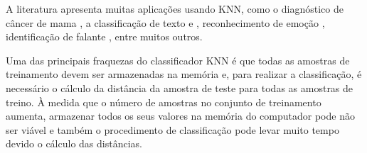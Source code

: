 A literatura apresenta muitas aplicações usando KNN, como o diagnóstico de câncer de mama \cite{Sarkar_2000}, a classificação de texto \cite{Yu_2007} e \cite{Han_2001}, reconhecimento de emoção \cite{Cheng_2008}, identificação de falante \cite{Kacur_2011} , entre muitos outros. 

Uma das principais fraquezas do classificador KNN é que todas as amostras de treinamento devem ser armazenadas na memória e, para realizar a classificação, é necessário o cálculo da distância da amostra de teste para todas as amostras de treino.  À medida que o número de amostras no conjunto de treinamento aumenta, armazenar todos os seus valores na memória do computador pode não ser viável e também o procedimento de classificação pode levar muito tempo devido o cálculo das distâncias.


